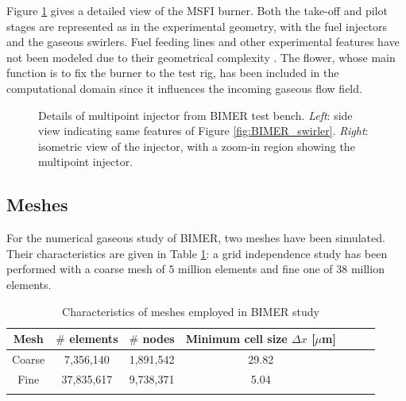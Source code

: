 Figure \ref{fig:BIMER_geometry_flower_details} gives a detailed view of the MSFI burner. Both the take-off and pilot stages are represented as in the experimental geometry, with the fuel injectors and the gaseous swirlers. Fuel feeding lines and other experimental features have not been modeled due to their geometrical complexity . The flower, whose main function is to fix the burner to the test rig, has been included in the computational domain since it influences the incoming gaseous flow field.

\begin{figure}[h!]
	\centering
	\caption[Details of multipoint injector from BIMER test bench.]{Details of multipoint injector from BIMER test bench. \textsl{Left}: side view indicating same features of Figure \ref{fig:BIMER_swirler}. \textsl{Right}: isometric view of the injector, with a zoom-in region showing the multipoint injector.}
	\label{fig:BIMER_geometry_flower_details}
\end{figure}

\subsection{Meshes}

For the numerical gaseous study of BIMER, two meshes have been simulated. Their characteristics are given in Table \ref{tab:BIMER_meshes_gaseous}: a grid independence study has been performed with a coarse mesh of $5$ million elements and fine one of $38$ million elements. 

\begin{table}[!h]
\centering
\caption{Characteristics of meshes employed in BIMER study}
\begin{tabular}{ccccccc}
\thickhline
Mesh   & $\#$ elements & $\#$ nodes & Minimum cell size $\Delta x$ [$\mu$m] \\
\hline
Coarse & 7,356,140 & 1,891,542 & 29.82 \\ %
Fine & 37,835,617 & 9,738,371 & 5.04\\ %
\thickhline
\end{tabular}
\label{tab:BIMER_meshes_gaseous}
\end{table}

